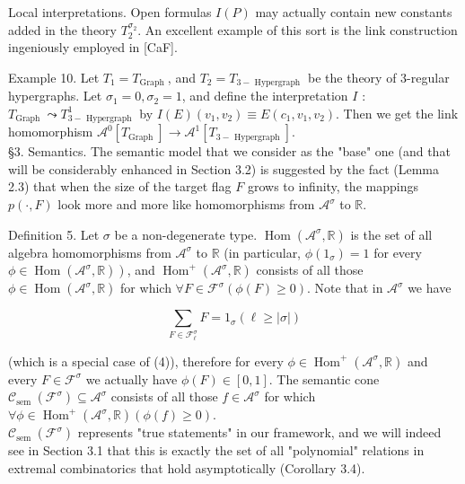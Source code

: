 \documentclass[10pt]{article}
\begin{document}
Local interpretations. Open formulas $I(P)$ may actually contain new constants added in the theory $T_{2}^{\sigma_{2}}$. An excellent example of this sort is the link construction ingeniously employed in [CaF].

Example 10. Let $T_{1}=T_{\text {Graph }}$, and $T_{2}=T_{3-\text { Hypergraph }}$ be the theory of 3-regular hypergraphs. Let $\sigma_{1}=0, \sigma_{2}=1$, and define the interpretation $I$ : $T_{\text {Graph }} \leadsto T_{3-\text { Hypergraph }}^{1}$ by $I(E)\left(v_{1}, v_{2}\right) \equiv E\left(c_{1}, v_{1}, v_{2}\right)$. Then we get the link homomorphism $\mathcal{A}^{0}\left[T_{\text {Graph }}\right] \longrightarrow \mathcal{A}^{1}\left[T_{3-\text { Hypergraph }}\right]$.\\
§3. Semantics. The semantic model that we consider as the "base" one (and that will be considerably enhanced in Section 3.2) is suggested by the fact (Lemma 2.3) that when the size of the target flag $F$ grows to infinity, the mappings $p(\cdot, F)$ look more and more like homomorphisms from $\mathcal{A}^{\sigma}$ to $\mathbb{R}$.

Definition 5. Let $\sigma$ be a non-degenerate type. $\operatorname{Hom}\left(\mathcal{A}^{\sigma}, \mathbb{R}\right)$ is the set of all algebra homomorphisms from $\mathcal{A}^{\sigma}$ to $\mathbb{R}$ (in particular, $\phi\left(1_{\sigma}\right)=1$ for every $\left.\phi \in \operatorname{Hom}\left(\mathcal{A}^{\sigma}, \mathbb{R}\right)\right)$, and $\operatorname{Hom}^{+}\left(\mathcal{A}^{\sigma}, \mathbb{R}\right)$ consists of all those $\phi \in \operatorname{Hom}\left(\mathcal{A}^{\sigma}, \mathbb{R}\right)$ for which $\forall F \in \mathcal{F}^{\sigma}(\phi(F) \geq 0)$. Note that in $\mathcal{A}^{\sigma}$ we have


\begin{equation*}
\sum_{F \in \mathcal{F}_{\ell}^{\sigma}} F=1_{\sigma}(\ell \geq|\sigma|) \tag{11}
\end{equation*}


(which is a special case of (4)), therefore for every $\phi \in \operatorname{Hom}^{+}\left(\mathcal{A}^{\sigma}, \mathbb{R}\right)$ and every $F \in \mathcal{F}^{\sigma}$ we actually have $\phi(F) \in[0,1]$. The semantic cone $\mathcal{C}_{\text {sem }}\left(\mathcal{F}^{\sigma}\right) \subseteq \mathcal{A}^{\sigma}$ consists of all those $f \in \mathcal{A}^{\sigma}$ for which $\forall \phi \in \operatorname{Hom}^{+}\left(\mathcal{A}^{\sigma}, \mathbb{R}\right)(\phi(f) \geq 0)$.\\
$\mathcal{C}_{\text {sem }}\left(\mathcal{F}^{\sigma}\right)$ represents "true statements" in our framework, and we will indeed see in Section 3.1 that this is exactly the set of all "polynomial" relations in extremal combinatorics that hold asymptotically (Corollary 3.4).
\end{document}
